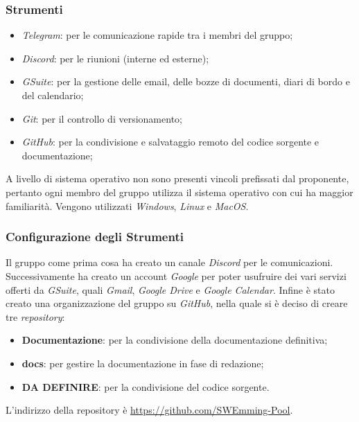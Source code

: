         \subsubsection{Strumenti}
            \begin{itemize}
                \item \textit{Telegram}: per le comunicazione rapide tra i membri del gruppo;
                \item \textit{Discord}: per le riunioni (interne ed esterne);
                \item \textit{GSuite}: per la gestione delle email, delle bozze di documenti, diari di bordo e del calendario;
                \item \textit{Git}: per il controllo di versionamento;
                \item \textit{GitHub}: per la condivisione e salvataggio remoto del codice sorgente e documentazione;
            \end{itemize}
            
            A livello di sistema operativo non sono presenti vincoli prefissati dal proponente, pertanto ogni membro del gruppo utilizza il sistema operativo con cui ha maggior familiarità.
            Vengono utilizzati \textit{Windows}, \textit{Linux} e \textit{MacOS}.

        \subsubsection{Configurazione degli Strumenti}
            Il gruppo come prima cosa ha creato un canale \textit{Discord} per le comunicazioni.
            Successivamente ha creato un account \textit{Google} per poter usufruire dei vari servizi offerti da \textit{GSuite}, quali \textit{Gmail}, \textit{Google Drive} e \textit{Google Calendar}.
            Infine è stato creato una organizzazione del gruppo su \textit{GitHub}, nella quale si è deciso di creare tre \textit{repository}:
                \begin{itemize}
                    \item \textbf{Documentazione}: per la condivisione della documentazione definitiva;
                    \item \textbf{docs}: per gestire la documentazione in fase di redazione;
                    \item \textbf{DA DEFINIRE}: per la condivisione del codice sorgente.
                \end{itemize}
            L'indirizzo della repository è \href{https://github.com/SWEmming-Pool}{https://github.com/SWEmming-Pool}.
